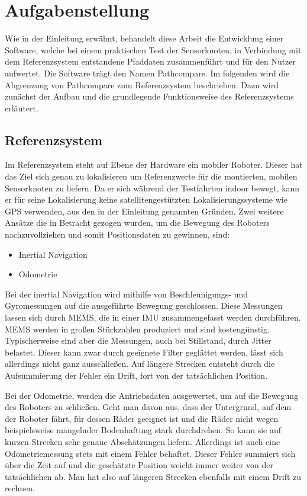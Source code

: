 \section{Aufgabenstellung}
\label{sec:aufgabenstellung}

Wie in der Einleitung erwähnt, behandelt diese Arbeit die Entwicklung einer
Software, welche bei einem praktischen Test der Sensorknoten, in Verbindung mit
dem Referenzsystem entstandene Pfaddaten zusammenführt und für den Nutzer
aufwertet. Die Software trägt den Namen Pathcompare.
Im folgenden wird die Abgrenzung von Pathcompare zum 
Referenzsystem beschrieben. Dazu wird zunächst der Aufbau und die grundlegende
Funktionsweise des Referenzsystems erläutert.

\subsection{Referenzsystem}
\label{sub:roboter}

Im Referenzsystem steht auf Ebene der Hardware ein mobiler Roboter. Dieser hat
das Ziel sich genau zu lokalisieren um Referenzwerte für die montierten,
mobilen Sensorknoten zu liefern. Da er sich während der Testfahrten indoor
bewegt, kann er für seine Lokalisierung keine satellitengestützten
Lokalisierungssysteme wie GPS verwenden, aus den in der Einleitung genannten
Gründen. Zwei weitere Ansätze die in Betracht gezogen wurden, um die Bewegung
des Roboters nachzuvollziehen und somit Positionsdaten zu gewinnen, sind:

\begin{itemize}
  \item Inertial Navigation
  \item Odometrie
\end{itemize}

Bei der inertial Navigation wird mithilfe von Beschleunigungs- und
Gyromessungen auf die ausgeführte Bewegung geschlossen. Diese Messungen lassen
sich durch \gls{MEMS}, die in einer 
\gls{IMU} zusammengefasst werden durchführen.
\gls{MEMS} werden in großen Stückzahlen produziert und sind kostengünstig.
Typischerweise sind aber die Messungen, auch bei Stillstand, durch Jitter belastet.
Dieser kann zwar durch geeignete Filter geglättet werden, lässt sich allerdings
nicht ganz ausschließen. Auf längere Strecken entsteht durch die Aufsummierung
der Fehler ein Drift, fort von der tatsächlichen Position.

Bei der Odometrie, werden die Antriebsdaten ausgewertet, um auf die Bewegung
des Roboters zu schließen. Geht man davon aus, dass der Untergrund, auf dem der
Roboter fährt, für dessen Räder geeignet ist und die Räder nicht wegen
beispielsweise mangelnder Bodenhaftung stark durchdrehen. So kann sie auf
kurzen Strecken sehr genaue Abschätzungen liefern. Allerdings ist auch eine
Odometriemessung stets mit einem Fehler behaftet. Dieser Fehler summiert sich
über die Zeit auf und die geschätzte Position weicht immer weiter von der
tatsächlichen ab. Man hat also auf längeren Strecken ebenfalls mit einem Drift
zu rechnen.

